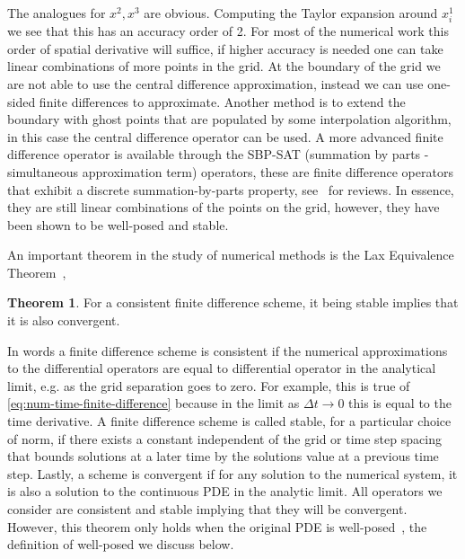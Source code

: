 \documentclass[10pt]{report}
\theoremstyle{definition}
\newtheorem{theorem}{Theorem}[chapter]
\begin{document}
The analogues for $x^2,x^3$ are obvious. Computing the Taylor expansion around $x^1_i$ we see that this has an accuracy order of 2. For most of the numerical work this order of spatial derivative will suffice, if higher accuracy is needed one can take linear combinations of more points in the grid. At the boundary of the grid we are not able to use the central difference approximation, instead we can use one-sided finite differences to approximate. Another method is to extend the boundary with ghost points that are populated by some interpolation algorithm, in this case the central difference operator can be used. A more advanced finite difference operator is available through the SBP-SAT (summation by parts - simultaneous approximation term) operators, these are finite difference operators that exhibit a discrete summation-by-parts property, see~\cite{Review_of_summa_Del_Re_2014,Review_of_summa_Svard_2014} for reviews. In essence, they are still linear combinations of the points on the grid, however, they have been shown to be well-posed and stable.

An important theorem in the study of numerical methods is the Lax Equivalence Theorem~\cite{LaxRichtmyer1956},
\begin{theorem}
    For a consistent finite difference scheme, it being stable implies that it is also convergent.
\end{theorem}
In words a finite difference scheme is consistent if the numerical approximations to the differential operators are equal to differential operator in the analytical limit, e.g. as the grid separation goes to zero. For example, this is true of \cref{eq:num-time-finite-difference} because in the limit as $\Delta t \rightarrow 0$ this is equal to the time derivative. A finite difference scheme is called stable, for a particular choice of norm, if there exists a constant independent of the grid or time step spacing that bounds solutions at a later time by the solutions value at a previous time step. Lastly, a scheme is convergent if for any solution to the numerical system, it is also a solution to the continuous PDE in the analytic limit. All operators we consider are consistent and stable implying that they will be convergent. However, this theorem only holds when the original PDE is well-posed~\cite{Well_Posed_Prob_Wendro_1968}, the definition of well-posed we discuss below.
\end{document}
